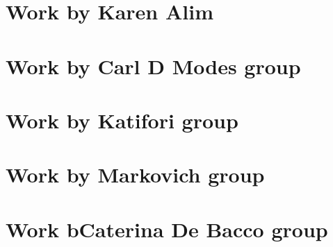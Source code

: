 \documentclass[10pt,a4paper,twocolumn]{article}
\begin{document}
	
	
	\section{Work by Karen Alim}
	
	\section{Work by Carl D Modes group}
	
	\section{Work by Katifori group}
	
	\section{Work by Markovich group}
	
	
	\section{Work bCaterina De Bacco group}
	
	\newpage
	
\end{document}

